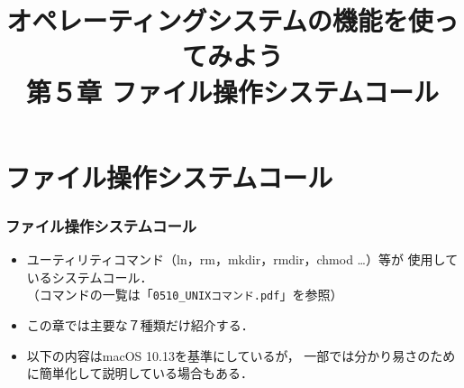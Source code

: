 \documentclass{beamer}                 %
\begin{document}
\title{オペレーティングシステムの機能を使ってみよう\\
第５章 ファイル操作システムコール}
\date{}

\begin{frame}
  \titlepage
\end{frame}


\section{ファイル操作システムコール}
\begin{frame}[fragile]
  \frametitle{ファイル操作システムコール}
  \begin{itemize}
    \item ユーティリティコマンド（ln，rm，mkdir，rmdir，chmod …）等が
      使用しているシステムコール．\\
      （コマンドの一覧は「\texttt{0510\_UNIXコマンド.pdf}」を参照）
    \item この章では主要な７種類だけ紹介する．
    \item 以下の内容はmacOS 10.13を基準にしているが，
      一部では分かり易さのために簡単化して説明している場合もある．
  \end{itemize}
\end{frame}
\end{document}
